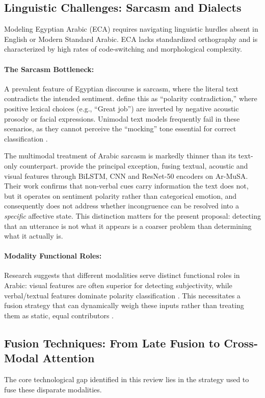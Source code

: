 \documentclass[12pt, a4paper]{article}
\begin{document}
\subsection{Linguistic Challenges: Sarcasm and Dialects}
Modeling Egyptian Arabic (ECA) requires navigating linguistic hurdles absent in English or Modern Standard Arabic. ECA lacks standardized orthography and is characterized by high rates of code-switching and morphological complexity.

\paragraph{The Sarcasm Bottleneck:} A prevalent feature of Egyptian discourse is sarcasm, where the literal text contradicts the intended sentiment. \citet{Rahma2023} define this as ``polarity contradiction,'' where positive lexical choices (e.g., ``Great job'') are inverted by negative acoustic prosody or facial expressions. Unimodal text models frequently fail in these scenarios, as they cannot perceive the ``mocking'' tone essential for correct classification \citep{Rahma2023}.

The multimodal treatment of Arabic sarcasm is markedly thinner than its text-only counterpart. \citet{Cheikhi2025} provide the principal exception, fusing textual, acoustic and visual features through BiLSTM, CNN and ResNet-50 encoders on Ar-MuSA. Their work confirms that non-verbal cues carry information the text does not, but it operates on sentiment polarity rather than categorical emotion, and consequently does not address whether incongruence can be resolved into a \emph{specific} affective state. This distinction matters for the present proposal: detecting that an utterance is not what it appears is a coarser problem than determining what it actually is.

\paragraph{Modality Functional Roles:} Research suggests that different modalities serve distinct functional roles in Arabic: visual features are often superior for detecting subjectivity, while verbal/textual features dominate polarity classification \citep{Alqarafi2019}. This necessitates a fusion strategy that can dynamically weigh these inputs rather than treating them as static, equal contributors \citep{Youcef2021}.

\subsection{Fusion Techniques: From Late Fusion to Cross-Modal Attention}
The core technological gap identified in this review lies in the strategy used to fuse these disparate modalities.
\end{document}
